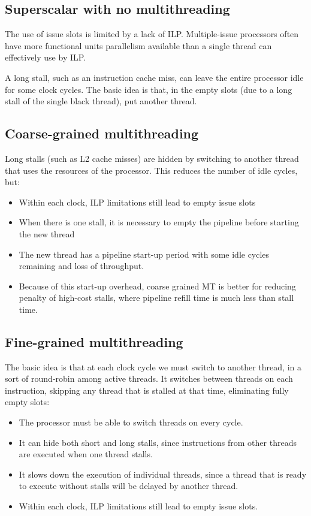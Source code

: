 \subsection{Superscalar with no multithreading}

The use of issue slots is limited by a lack of ILP. Multiple-issue processors often have more functional units parallelism available than a single thread can effectively use by ILP.

A long stall, such as an instruction cache miss, can leave the entire processor idle for some clock cycles. The basic idea is that, in the empty slots (due to a long stall of the single black thread), put another thread.

\subsection{Coarse-grained multithreading}

Long stalls (such as L2 cache misses) are hidden by switching to another thread that uses the resources of the processor. This reduces the number of idle cycles, but:

\begin{itemize}
	\item Within each clock, ILP limitations still lead to empty issue slots
	\item When there is one stall, it is necessary to empty the pipeline before starting the new thread
	\item The new thread has a pipeline start-up period with some idle cycles remaining and loss of throughput.
	\item Because of this start-up overhead, coarse grained MT is better for reducing penalty of high-cost stalls, where pipeline refill time is much less than stall time.
\end{itemize}

\subsection{Fine-grained multithreading}

The basic idea is that at each clock cycle we must switch to another thread, in a sort of round-robin among active threads. It switches between threads on each instruction, skipping any thread that is stalled at that time, eliminating fully empty slots:

\begin{itemize}
	\item The processor must be able to switch threads on every cycle.
	\item It can hide both short and long stalls, since instructions from other threads are executed when one thread stalls.
	\item It slows down the execution of individual threads, since a thread that is ready to execute without stalls will be delayed by another thread.
	\item Within each clock, ILP limitations still lead to empty issue slots.
\end{itemize}

